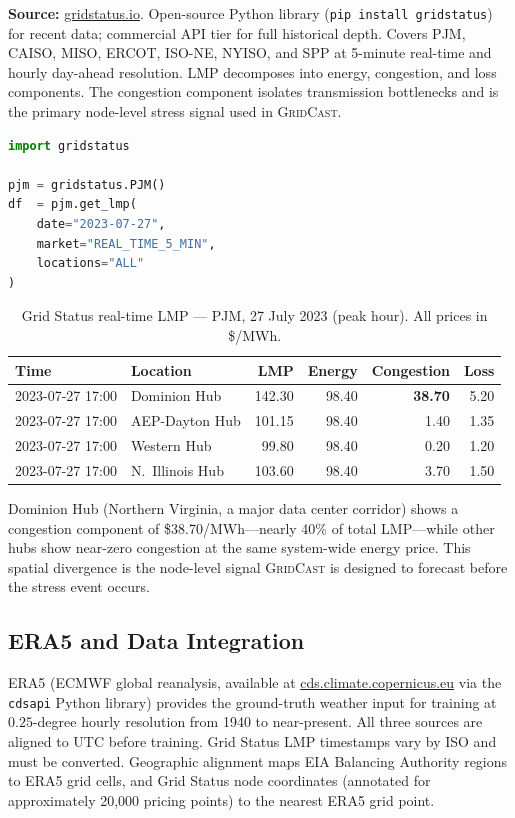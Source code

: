 \documentclass[10pt,letterpaper]{article}
\newcommand{\gridcast}{\textsc{GridCast}\xspace}
\begin{document}
\textbf{Source:} \url{gridstatus.io}. Open-source Python library (\texttt{pip install
gridstatus}) for recent data; commercial API tier for full historical depth. Covers PJM, CAISO,
MISO, ERCOT, ISO-NE, NYISO, and SPP at 5-minute real-time and hourly day-ahead resolution.
LMP decomposes into energy, congestion, and loss components. The congestion component
isolates transmission bottlenecks and is the primary node-level stress signal used in
\gridcast.

\begin{lstlisting}[language=Python, caption={Fetching PJM real-time LMP via \texttt{gridstatus}.}, label={lst:gridstatus}]
import gridstatus

pjm = gridstatus.PJM()
df  = pjm.get_lmp(
    date="2023-07-27",
    market="REAL_TIME_5_MIN",
    locations="ALL"
)
\end{lstlisting}

\begin{table}[H]
\centering
\caption{Grid Status real-time LMP --- PJM, 27 July 2023 (peak hour). All prices in \$/MWh.}
\label{tab:lmp}
\renewcommand{\arraystretch}{1.2}
\begin{tabular}{@{}llrrrr@{}}
\toprule
\textbf{Time} & \textbf{Location} & \textbf{LMP} & \textbf{Energy} & \textbf{Congestion} & \textbf{Loss} \\
\midrule
2023-07-27 17:00 & Dominion Hub      & 142.30 & 98.40 & \textbf{38.70} & 5.20 \\
2023-07-27 17:00 & AEP-Dayton Hub    & 101.15 & 98.40 & 1.40  & 1.35 \\
2023-07-27 17:00 & Western Hub       &  99.80 & 98.40 & 0.20  & 1.20 \\
2023-07-27 17:00 & N.\ Illinois Hub  & 103.60 & 98.40 & 3.70  & 1.50 \\
\bottomrule
\end{tabular}
\end{table}

Dominion Hub (Northern Virginia, a major data center corridor) shows a congestion component
of \$38.70/MWh---nearly 40\% of total LMP---while other hubs show near-zero congestion at the
same system-wide energy price. This spatial divergence is the node-level signal \gridcast is
designed to forecast before the stress event occurs.

\subsection{ERA5 and Data Integration}
\label{app:era5}

ERA5 (ECMWF global reanalysis, available at \url{cds.climate.copernicus.eu} via the
\texttt{cdsapi} Python library) provides the ground-truth weather input for training at
$0.25$-degree hourly resolution from 1940 to near-present. All three sources are aligned to
UTC before training. Grid Status LMP timestamps vary by ISO and must be converted.
Geographic alignment maps EIA Balancing Authority regions to ERA5 grid cells, and Grid
Status node coordinates (annotated for approximately 20,000 pricing points) to the nearest
ERA5 grid point.
\end{document}
